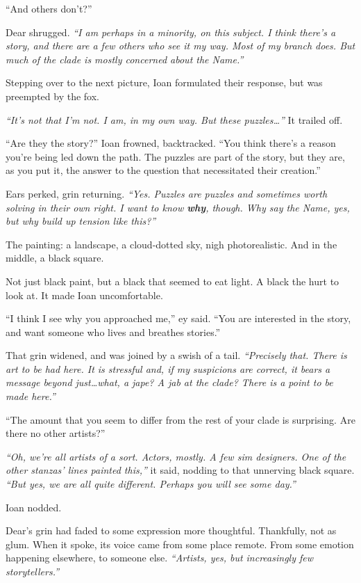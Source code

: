 ``And others don't?''

Dear shrugged. \emph{``I am perhaps in a minority, on this subject. I think there's a story, and there are a few others who see it my way. Most of my branch does. But much of the clade is mostly concerned about the Name.''}

Stepping over to the next picture, Ioan formulated their response, but was preempted by the fox.

\emph{``It's not that I'm not. I am, in my own way. But these puzzles\ldots{}''} It trailed off.

``Are they the story?'' Ioan frowned, backtracked. ``You think there's a reason you're being led down the path. The puzzles are part of the story, but they are, as you put it, the answer to the question that necessitated their creation.''

Ears perked, grin returning. \emph{``Yes. Puzzles are puzzles and sometimes worth solving in their own right. I want to know \textbf{why}, though. Why say the Name, yes, but why build up tension like this?''}

The painting: a landscape, a cloud-dotted sky, nigh photorealistic. And in the middle, a black square.

Not just black paint, but a black that seemed to eat light. A black the hurt to look at. It made Ioan uncomfortable.

``I think I see why you approached me,'' ey said. ``You are interested in the story, and want someone who lives and breathes stories.''

That grin widened, and was joined by a swish of a tail. \emph{``Precisely that. There is art to be had here. It is stressful and, if my suspicions are correct, it bears a message beyond just\ldots{}what, a jape? A jab at the clade? There is a point to be made here.''}

``The amount that you seem to differ from the rest of your clade is surprising. Are there no other artists?''

\emph{``Oh, we're all artists of a sort. Actors, mostly. A few sim designers. One of the other stanzas' lines painted this,''} it said, nodding to that unnerving black square. \emph{``But yes, we are all quite different. Perhaps you will see some day.''}

Ioan nodded.

Dear's grin had faded to some expression more thoughtful. Thankfully, not as glum. When it spoke, its voice came from some place remote. From some emotion happening elsewhere, to someone else. \emph{``Artists, yes, but increasingly few storytellers.''}
